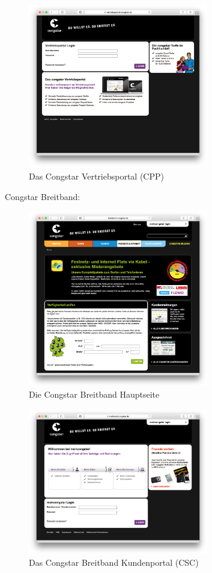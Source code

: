 \documentclass[11pt,a4paper]{article}
\begin{document}
\begin{figure}[H]
\includegraphics[width=0.7\textwidth]{images/Sites/Congstar_CPP.png}
\centering
\caption{Das Congstar Vertriebsportal (CPP) \cite{congstarv}}
\end{figure}

\pagebreak
Congstar Breitband:

\begin{figure}[H]
\includegraphics[width=0.7\textwidth]{images/Sites/Congstar_Breitband.png}
\centering
\caption{Die Congstar Breitband Hauptseite \cite{congstarb}}
\label{figure1}
\end{figure}

\begin{figure}[H]
\includegraphics[width=0.7\textwidth]{images/Sites/Congstar_Breitband_CSC.png}
\centering
\caption{Das Congstar Breitband Kundenportal (CSC) \cite{congstarbcsc}}
\end{figure}
\end{document}
